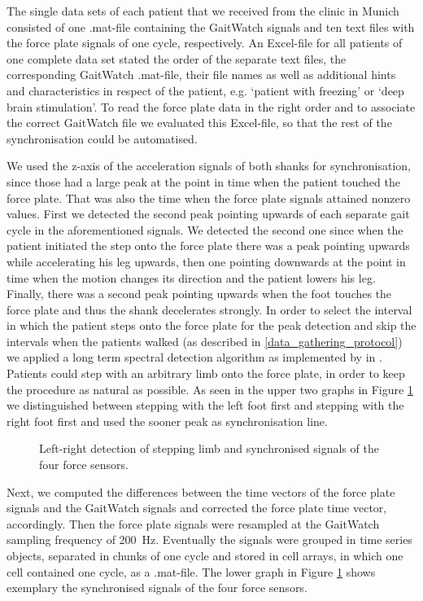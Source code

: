 The single data sets of each patient that we received from the clinic in Munich consisted of one .mat-file containing the GaitWatch signals and ten text files with the force plate signals of one cycle, respectively. An Excel-file for all patients of one complete data set stated the order of the separate text files, the corresponding GaitWatch .mat-file, their file names as well as additional hints and characteristics in respect of the patient, e.g. `patient with freezing' or `deep brain stimulation'. To read the force plate data in the right order and to associate the correct GaitWatch file we evaluated this Excel-file, so that the rest of the synchronisation could be automatised.

We used the z-axis of the acceleration signals of both shanks for synchronisation, since those had a large peak at the point in time when the patient touched the force plate. That was also the time when the force plate signals attained nonzero values.  First we detected the second peak pointing upwards of each separate gait cycle in the aforementioned signals. We detected the second one since when the patient initiated the step onto the force plate there was a peak pointing upwards while accelerating his leg upwards, then one pointing downwards at the point in time when the motion changes its direction and the patient lowers his leg. Finally, there was a second peak pointing upwards when the foot touches the force plate and thus the shank decelerates strongly. In order to select the interval in which the patient steps onto the force plate for the peak detection and skip the intervals when the patients walked (as described in \ref{data_gathering_protocol}) we applied a long term spectral detection algorithm as implemented by \citeauthor{olivares_vicente_signal_2013} in \cite{olivares_vicente_signal_2013}. Patients could step with an arbitrary limb onto the force plate, in order to keep the procedure as natural as possible. As seen in the upper two graphs in Figure \ref{fig:left_right_detect} we distinguished between stepping with the left foot first and stepping with the right foot first and used the sooner peak as synchronisation line. 

\begin{figure}
	\centering
	\caption{Left-right detection of stepping limb and synchronised signals of the four force sensors.}
	\label{fig:left_right_detect}
\end{figure}

  Next, we computed the differences between the time vectors of the force plate signals and the GaitWatch signals and corrected the force plate time vector, accordingly. Then the force plate signals were resampled at the GaitWatch sampling frequency of \mbox{200 Hz}. Eventually the signals were grouped in time series objects, separated in chunks of one cycle and stored in cell arrays, in which one cell contained one cycle, as a .mat-file. The lower graph in Figure \ref{fig:left_right_detect} shows exemplary the synchronised signals of the four force sensors. 

